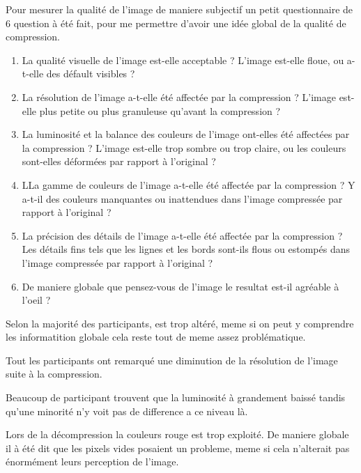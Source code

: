 \documentclass{article}
\begin{document}
Pour mesurer la qualité de l'image de maniere subjectif un petit questionnaire de 6 question à été fait, pour me permettre d'avoir une idée global de la qualité de compression.
\begin{enumerate}
\item La qualité visuelle de l'image est-elle acceptable ? L'image est-elle floue, ou a-t-elle des défault visibles ? \\
\item La résolution de l'image a-t-elle été affectée par la compression ? L'image est-elle plus petite ou plus granuleuse qu'avant la compression ? \\
\item La luminosité et la balance des couleurs de l'image ont-elles été affectées par la compression ? L'image est-elle trop sombre ou trop
   claire, ou les couleurs sont-elles déformées par rapport à l'original ? \\
\item LLa gamme de couleurs de l'image a-t-elle été affectée par la compression ? Y a-t-il des couleurs manquantes ou inattendues dans l'image compressée par rapport à l'original ? \\
\item La précision des détails de l'image a-t-elle été affectée par la compression ? Les détails fins tels que les lignes et les bords sont-ils flous ou estompés dans l'image compressée par rapport à l'original ? \\
\item De maniere globale que pensez-vous de l'image le resultat est-il agréable à l'oeil ? \\
\end{enumerate}

Selon la majorité des participants, est trop altéré, meme si on peut y comprendre les informatition globale cela reste tout de meme assez problématique.

Tout les participants ont remarqué une diminution de la résolution de l'image suite à la compression.

Beaucoup de participant trouvent que la luminosité à grandement baissé tandis qu'une minorité n'y voit pas de difference a ce niveau là.

Lors de la décompression la couleurs rouge est trop exploité.
De maniere globale il à été dit que les pixels vides posaient un probleme, meme si cela n'alterait pas énormément leurs perception de l'image.
\end{document}

